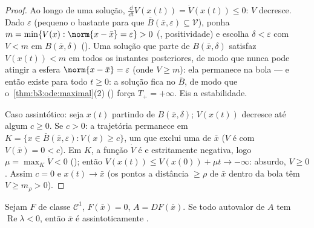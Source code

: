 \begin{proof}
Ao longo de uma solução, $\frac{\dd}{\dd t}V(x(t)) = \dot V(x(t))
\leq 0$: $V$ decresce. Dado $\varepsilon$ (pequeno o
bastante para que $\bar B(\bar x, \varepsilon) \subseteq \mathcal V$), ponha $m = \min\{V(x) : \norm{x - \bar x} = \varepsilon\} > 0$ (, positividade) e
escolha $\delta < \varepsilon$ com $V < m$ em $B(\bar x, \delta)$ (). Uma solução que
parte de $B(\bar x, \delta)$ satisfaz $V(x(t)) < m$ em todos os instantes posteriores, de modo
que nunca pode atingir a esfera $\norm{x -
\bar x} = \varepsilon$ (onde $V \geq m$): ela permanece na
bola --- e então existe para todo $t \geq 0$: a solução fica no 
$\bar B$, de modo que o~\cref{thm:b3:ode:maximal}(2) () força
$T_+ = +\infty$. Eis a estabilidade.

Caso assintótico: seja $x(t)$ partindo de $B(\bar x, \delta)$; $V(x(t))$ decresce até
algum $c \geq 0$. Se $c > 0$: a trajetória permanece em $K = \{x \in \bar B(\bar x,
\varepsilon): V(x) \geq c\}$, um 
que exclui uma  de $\bar x$ ($V$ é  com $V(\bar x)
= 0 < c$).
Em $K$, a função $\dot V$ é  e estritamente negativa,
logo $\mu = \max_K\dot V < 0$ (); então $V(x(t)) \leq V(x(0)) + \mu t \to
-\infty$: absurdo, $V \geq 0$. Assim $c = 0$
e $x(t) \to \bar x$ (os pontos a distância $\geq
\rho$ de $\bar x$ dentro da bola têm
$V \geq m_\rho >
0$).
\end{proof}

\begin{theorem}
\label{thm:b3:ode:linearization}
Sejam $F$ de classe $\mathcal C^1$, $F(\bar x) = 0$, $A = DF(\bar x)$. Se todo autovalor de
$A$ tem $\operatorname{Re}\lambda <
0$, então $\bar x$ é assintoticamente
.
\end{theorem}

